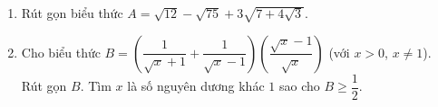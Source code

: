 \begin{ex}%
\hfill
\begin{enumerate}
\item Rút gọn biểu thức $A=\sqrt{12}-\sqrt{75}+3\sqrt{7+4\sqrt{3}}$.
\item Cho biểu thức $B=\left(\dfrac{1}{\sqrt{x}+1}+\dfrac{1}{\sqrt{x}-1}\right)\left(\dfrac{\sqrt{x}-1}{\sqrt{x}}\right)$ (với $x>0$, $x\neq 1$).\\
Rút gọn $B$. Tìm $x$ là số nguyên dương khác $1$ sao cho $B\geq \dfrac{1}{2}$.
\end{enumerate}
\end{ex}

